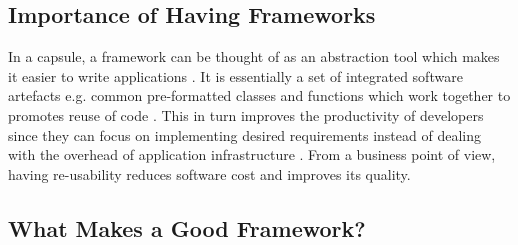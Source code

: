 \subsection{Importance of Having Frameworks}
\label{subsec:importance-of-having-frameworks}

In a capsule, a framework can be thought of as an abstraction tool which makes it easier to write applications \cite{1stwebdesigner}. It is essentially a set of integrated software artefacts e.g. common pre-formatted classes and functions which work together to promotes reuse of code \cite{framework-report-vamderbilt}. This in turn improves the productivity of developers since they can focus on implementing desired requirements instead of dealing with the overhead of application infrastructure \cite{cimetrix}. From a business point of view, having re-usability reduces software cost and improves its quality.

\subsection{What Makes a Good Framework?}
\label{subsec:what-makes-a-good-framework}

